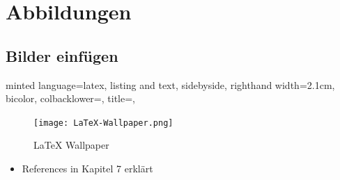 \documentclass[
    ngerman,
    accentcolor=3b,
    dark_mode,
    fontsize= 12pt,
    a4paper,
    aspectratio=169,
    colorback=true,
    fancy_row_colors,
    leqno,
    fleqn,
    boxarc=3pt,
    fleqn,
]{algoslides}
\begin{document}
    \section{Abbildungen}
    \subsection{Bilder einfügen}
    \begin{frame}[c, fragile]
        \slidehead{}
        \begin{codeBlock}[
            ]{
            minted language=latex,
            listing and text,
            sidebyside,
            righthand width=2.1cm,
            bicolor,
            colbacklower=,
            title=,
            }
            \begin{figure}[ht!]
                \centering
                \texttt{[image: LaTeX-Wallpaper.png]}
                \caption{LaTeX Wallpaper}
                \label{fig:latexlogo}
            \end{figure}
        \end{codeBlock}
        \begin{itemize}
            \item References in Kapitel 7 erklärt
        \end{itemize}
    \end{frame}
\end{document}
